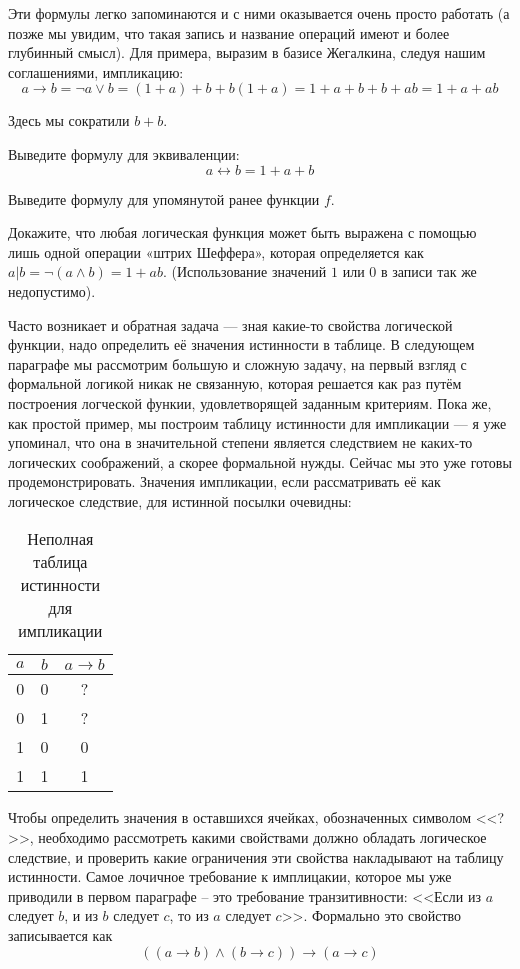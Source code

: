 Эти формулы легко запоминаются и с ними оказывается очень просто работать (а позже мы увидим, что такая запись и название операций имеют и более глубинный смысл). Для примера, выразим в базисе Жегалкина, следуя нашим соглашениями, импликацию: $$a \rightarrow b = \neg a \lor b = (1 + a) + b + b(1 + a) = 1 + a + b + b + ab = 1 + a + ab$$

Здесь мы сократили $b+b$.

\begin{exercise} Выведите формулу для эквиваленции: $$a \leftrightarrow b = 1 + a + b$$\end{exercise}

\begin{exercise} Выведите формулу для упомянутой ранее функции $f$.\end{exercise}

\begin{exercise} Докажите, что любая логическая функция может быть выражена с помощью лишь одной операции «штрих Шеффера», которая определяется как $a|b = \neg(a\land b) = 1 + ab$. (Использование значений $1$ или $0$ в записи так же недопустимо).\end{exercise}

Часто возникает и обратная задача --- зная какие-то свойства логической функции, надо определить её значения истинности в таблице. В следующем параграфе мы рассмотрим большую и сложную задачу, на первый взгляд с формальной логикой никак не связанную, которая решается как раз путём построения логческой функии, удовлетворящей заданным критериям. Пока же, как простой пример, мы построим таблицу истинности для импликации --- я уже упоминал, что она в значительной степени является следствием не каких-то логических соображений, а скорее формальной нужды. Сейчас мы это уже готовы продемонстрировать. Значения импликации, если рассматривать её как логическое следствие, для истинной посылки очевидны:

\begin{table}[h]
\centering
\begin{tabular}{cc|c}
$a$ & $b$ & $a \to b$ \\
\hline
0 & 0 & ? \\
0 & 1 & ? \\
1 & 0 & 0 \\
1 & 1 & 1
\end{tabular}
\caption{Неполная таблица истинности для импликации}
\end{table}

Чтобы определить значения в оставшихся ячейках, обозначенных символом <<?>>, необходимо рассмотреть какими свойствами должно обладать логическое следствие, и проверить какие ограничения эти свойства накладывают на таблицу истинности. Самое лочичное требование к имплицакии, которое мы уже приводили в первом параграфе -- это требование транзитивности: <<Если из $a$ следует $b$, и из $b$ следует $c$, то из $a$ следует $c$>>. Формально это свойство записывается как $$((a\to b) \land (b \to c)) \to (a\to c) $$

